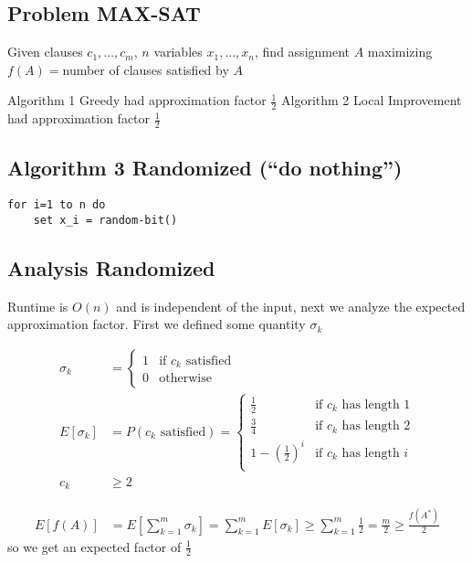 \documentclass[english,12pt]{article}
\theoremstyle{plain}
\theoremstyle{definition}
\theoremstyle{definition} %
\begin{document}
\subsection{Problem MAX-SAT}
Given clauses $c_1,\ldots,c_m$, $n$ variables $x_1,\ldots, x_n$, find assignment $A$ maximizing $f(A)=$number of clauses satisfied by $A$

Algorithm 1 Greedy had approximation factor $\frac{1}{2}$
Algorithm 2 Local Improvement had approximation factor $\frac{1}{2}$

\subsection{Algorithm 3 Randomized (``do nothing'')}
\begin{verbatim}
for i=1 to n do
    set x_i = random-bit()
\end{verbatim}

\subsection{Analysis Randomized}
Runtime is $O(n)$ and is independent of the input, next we analyze the expected approximation factor.  First we defined some quantity $\sigma_k$

\begin{align*}
\sigma_k&=
\begin{cases}
1 & \text{if }c_k\text{ satisfied}\\
0 & \text{otherwise}
\end{cases}\\
E\left[\sigma_k\right]&=P(c_k\text{ satisfied})
=\begin{cases}
\frac{1}{2} & \text{if }c_k\text{ has length }1\\
\frac{3}{4} & \text{if }c_k\text{ has length }2\\
1-\left(\frac{1}{2}\right)^i & \text{if }c_k\text{ has length }i\\
\end{cases}\\
c_k&\ge 2
\end{align*}



\begin{align*}
E\left[f(A)\right]&=E\left[\sum_{k=1}^m\sigma_k\right]
=\sum_{k=1}^m E\left[\sigma_k\right]
\ge \sum_{k=1}^m \frac{1}{2}
=\frac{m}{2}\ge\frac{f(A^\ast)}{2}
\end{align*}
so we get an expected factor of $\frac{1}{2}$
\end{document}
